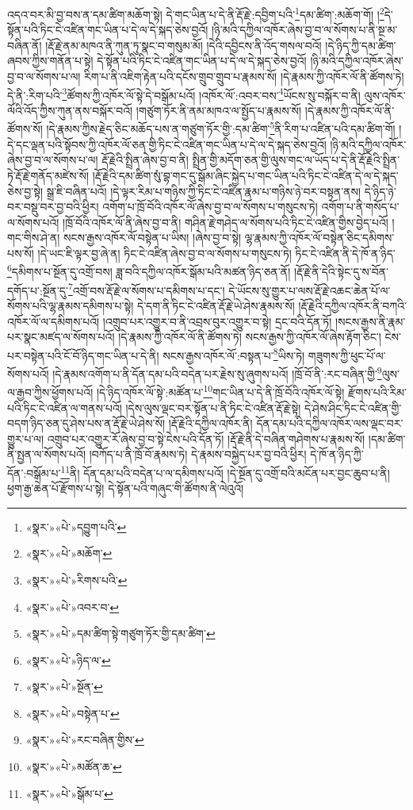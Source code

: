 འདའ་བར་མི་བྱ་བས་ན་དམ་ཚིག་མཆོག་སྟེ། དེ་གང་ཡིན་པ་དེ་ནི་རྡོ་རྗེ་:དབྱིག་པའི་\footnote{«སྣར་»«པེ་»དབྱུག་པའི་}དམ་ཚིག་:མཆོག་གོ། །\footnote{«སྣར་»«པེ་»མཆོག་}དེ་སྟོན་པའི་ཏིང་ངེ་འཛིན་གང་ཡིན་པ་དེ་ལ་དེ་སྐད་ཅེས་བྱའོ། །ཉི་མའི་དཀྱིལ་འཁོར་ཞེས་བྱ་བ་ལ་སོགས་པ་ནི་སྔ་མ་བཞིན་ནོ། །རྡོ་རྗེ་ནམ་མཁའ་ནི་ཀུན་ཏུ་སྣང་བ་གསུམ་མོ། །དེའི་དབྱིངས་ནི་འོད་གསལ་བའོ། །དེ་ཉིད་ཀྱི་དམ་ཚིག་ཞབས་ཀྱིས་གནོན་པ་སྟེ། དེ་སྟོན་པའི་ཏིང་ངེ་འཛིན་གང་ཡིན་པ་དེ་ལ་དེ་སྐད་ཅེས་བྱའོ། །ཉི་མའི་དཀྱིལ་འཁོར་ཞེས་བྱ་བ་ལ་སོགས་པ་ལ། རིག་པ་ནི་འཇིག་རྟེན་པའི་དངོས་གྲུབ་གྲུབ་པ་རྣམས་སོ། །དེ་རྣམས་ཀྱི་འཁོར་ལོ་ནི་ཚོགས་ཏེ། དེ་ནི་:རིག་པའི་\footnote{«སྣར་»«པེ་»རིགས་པའི་}ཚོགས་ཀྱི་འཁོར་ལོ་སྟེ་དེ་བསྒོམ་པའོ། །འཁོར་ལོ་:འབར་བས་\footnote{«སྣར་»«པེ་»འབར་བ་}ཡོངས་སུ་བསྐོར་བ་ནི། ལུས་འཁོར་ལོའི་འོད་ཀྱིས་ཀུན་ནས་བསྐོར་བའོ། །གཙུག་ཏོར་ནི་ནམ་མཁའ་ལ་སྤྱོད་པ་རྣམས་སོ། །དེ་རྣམས་ཀྱི་འཁོར་ལོ་ནི་ཚོགས་སོ། །དེ་རྣམས་ཀྱིས་རྗེད་ཅིང་མཆོད་པས་ན་གཙུག་ཏོར་གྱི་:དམ་ཚིག་\footnote{«སྣར་»«པེ་»དམ་ཚིག་སྟེ་གཙུག་ཏོར་གྱི་དམ་ཚིག་}ནི་རིག་པ་འཛིན་པའི་དམ་ཚིག་གོ། །དེ་དང་ལྡན་པའི་སྟོབས་ཀྱི་འཁོར་ལོ་ཅན་གྱི་ཏིང་ངེ་འཛིན་གང་ཡིན་པ་དེ་ལ་དེ་སྐད་ཅེས་བྱའོ། །ཉི་མའི་དཀྱིལ་འཁོར་ཞེས་བྱ་བ་ལ་སོགས་པ་ལ། རྡོ་རྗེའི་སྤྲིན་ཞེས་བྱ་བ་ནི། སྤྲིན་གྱི་མདོག་ཅན་གྱི་ལུས་གང་ལ་ཡོད་པ་དེ་ནི་རྡོ་རྗེའི་སྤྲིན་ཏེ་རྡོ་རྗེ་གནོད་མཛེས་སོ། །རྡོ་རྗེའི་དམ་ཚིག་སུཾ་བྷ་གང་དུ་སྒོམ་ཞིང་སྐྱེད་པ་གང་ཡིན་པའི་ཏིང་ངེ་འཛིན་དེ་ལ་དེ་སྐད་ཅེས་བྱ་སྟེ། སྒྲ་ཇི་བཞིན་པའོ། །དེ་ལྟར་རིམ་པ་གཉིས་ཀྱི་ཏིང་ངེ་འཛིན་རྣམ་པ་གཉིས་ཉེ་བར་བསྟན་ནས། དེ་ཉིད་ཉེ་བར་བསྡུ་བར་བྱ་བའི་ཕྱིར། འགོག་པ་ཁྲོ་བོའི་འཁོར་ལོ་ཞེས་བྱ་བ་ལ་སོགས་པ་གསུངས་ཏེ། འགོག་པ་ནི་གསོད་པ་ལ་སོགས་པའོ། །ཁྲོ་བོའི་འཁོར་ལོ་ནི་ཞེས་བྱ་བ་ནི། གཤིན་རྗེ་གཤེད་ལ་སོགས་པའི་ཏིང་ངེ་འཛིན་གྱིས་བྱེད་པའོ། །གང་གིས་ཤེ་ན། སངས་རྒྱས་འཁོར་ལོ་བསྟེན་པ་ཡིས། །ཞེས་བྱ་བ་སྟེ། ལྷ་རྣམས་ཀྱི་འཁོར་ལོ་བསྟེན་ཅིང་དམིགས་པས་སོ། །དེ་ཡང་ཇི་ལྟར་བྱ་ཞེ་ན། ཏིང་ངེ་འཛིན་ཞེས་བྱ་བ་ལ་སོགས་པ་གསུངས་ཏེ། ཏིང་ངེ་འཛིན་ནི་དེ་ཁོ་ན་ཉིད་\footnote{«སྣར་»«པེ་»ཉིད་ལ་}དམིགས་པ་སྔོན་དུ་འགྲོ་བས། ཟླ་བའི་དཀྱིལ་འཁོར་སྒོམ་པའི་མཚན་ཉིད་ཅན་ནོ། །རྡོ་རྗེ་ནི་དེའི་སྟེང་དུ་ས་བོན་དགོད་པ་:སྔོན་དུ་\footnote{«སྣར་»«པེ་»སྔོན་}འགྲོ་བས་རྡོ་རྗེ་ལ་སོགས་པ་དམིགས་པ་དང་། དེ་ཡོངས་སུ་གྱུར་པ་ལས་རྡོ་རྗེ་འཆང་ཆེན་པོ་ལ་སོགས་པའི་ལྷ་རྣམས་དམིགས་པ་སྟེ། དེ་དག་ནི་ཏིང་ངེ་འཛིན་རྡོ་རྗེ་ཡེ་ཤེས་རྣམས་སོ། །རྡོ་རྗེའི་དཀྱིལ་འཁོར་ནི་བཀའི་འཁོར་ལོ་ལ་དམིགས་པའོ། །འགྲུབ་པར་འགྱུར་བ་ནི་འབྲས་བུར་འགྱུར་བ་སྟེ། དྲང་བའི་དོན་ཏོ། །སངས་རྒྱས་ནི་རྣམ་པར་སྣང་མཛད་ལ་སོགས་པའོ། །དེ་རྣམས་ཀྱི་འཁོར་ལོ་ནི་ཚོགས་ཏེ། སངས་རྒྱས་ཀྱི་འཁོར་ལོ་ཞེས་རྟོག་ཅིང་། ངེས་པར་བསྟེན་པའི་ངོ་བོ་ཉིད་གང་ཡིན་པ་དེ་ནི། སངས་རྒྱས་འཁོར་ལོ་:བསྟན་པ་\footnote{«སྣར་»«པེ་»བསྟེན་པ་}ཡིས་ཏེ། གཟུགས་ཀྱི་ཕུང་པོ་ལ་སོགས་པའོ། །དེ་རྣམས་འགོག་པ་ནི་དོན་དམ་པའི་བདེན་པར་རྗེས་སུ་ཞུགས་པའོ། །ཁྲོ་བོ་ནི་:རང་བཞིན་གྱི་\footnote{«སྣར་»«པེ་»རང་བཞིན་གྱིས་}ལུས་ལ་རྒྱབ་ཀྱིས་ཕྱོགས་པའོ། །དེ་ཉིད་འཁོར་ལོ་སྟེ་:མཚོན་པ་\footnote{«སྣར་»«པེ་»མཚོན་ཆ་}གང་ཡིན་པ་དེ་ནི་ཁྲོ་བོའི་འཁོར་ལོ་སྟེ། རྫོགས་པའི་རིམ་པའི་ཏིང་ངེ་འཛིན་ལ་གནས་པའོ། །དེས་ལུས་ལྡང་བར་སྟོན་པ་ནི་ཏིང་ངེ་འཛིན་རྡོ་རྗེ་སྟེ། དེ་ཤེས་ཤིང་ཏིང་ངེ་འཛིན་གྱི་བདག་ཉིད་ཅན་དུ་ཤེས་པས་ན་རྡོ་རྗེ་ཡེ་ཤེས་སོ། །རྡོ་རྗེའི་དཀྱིལ་འཁོར་ནི། དོན་དམ་པའི་དཀྱིལ་འཁོར་ལས་ལྡང་བར་གྱུར་པ་ལ། འགྲུབ་པར་འགྱུར་རོ་ཞེས་བྱ་བ་སྟེ་ངེས་པའི་དོན་ཏོ། །རྡོ་རྗེ་ནི་དེ་བཞིན་གཤེགས་པ་རྣམས་སོ། །དམ་ཚིག་ནི་སྤྱན་ལ་སོགས་པའོ། །བཀོད་པ་ནི་ཁྲོ་བོ་རྣམས་ཏེ། དེ་རྣམས་བསྐྱེད་པར་བྱ་བའི་ཕྱིར། དེ་ཁོ་ན་ཉིད་ཀྱི་དོན་:བསྒོམ་པ་\footnote{«སྣར་»«པེ་»སྒོམ་པ་}ནི། དོན་དམ་པའི་བདེན་པ་ལ་དམིགས་པའོ། །དེ་སྔོན་དུ་འགྲོ་བའི་མངོན་པར་བྱང་ཆུབ་པ་ནི། ཕྱག་རྒྱ་ཆེན་པོ་རྫོགས་པ་སྟེ། དེ་སྟོན་པའི་གཞུང་གི་ཚོགས་ནི་ལེའུའོ། 